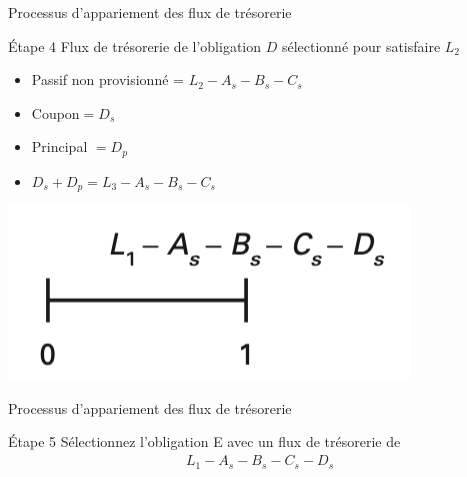 \documentclass[10pt,a4paper]{beamer}
\begin{document}
\begin{frame}{Processus d'appariement des flux de trésorerie}
\begin{block}{Étape 4}
Flux de trésorerie de l'obligation $D$ sélectionné pour satisfaire $L_2$
\begin{itemize}[label=\bullet]
\item Passif non provisionné = $L_2 - A_s-B_s-C_s$
\item Coupon$=D_s$ 
\item Principal $=D_p$
\item $D_s+D_p=L_3 - A_s-B_s-C_s$
\end{itemize}
\end{block}
\includegraphics[scale=.5]{5}
\end{frame}

\begin{frame}{Processus d'appariement des flux de trésorerie}
\begin{block}{Étape 5}
Sélectionnez l'obligation E avec un flux de trésorerie de
\begin{align*}
 L_1 - A_s - B_s - C_s - D_s
\end{align*}
\end{block}

\end{frame}
\end{document}
